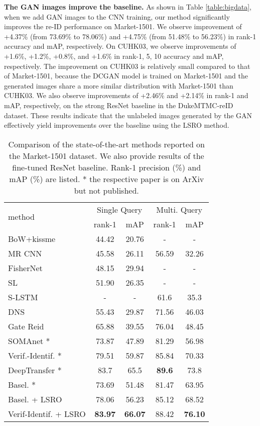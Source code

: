 \documentclass[10pt,twocolumn,letterpaper]{article}
\begin{document}
\textbf{The GAN images improve the baseline.}
As shown in Table \ref{table:bigdata}, when we add  GAN images to the CNN training, our method significantly improves the re-ID performance on Market-1501. We observe improvement of +4.37\% (from 73.69\% to 78.06\%) and +4.75\% (from 51.48\% to 56.23\%) in rank-1 accuracy and mAP, respectively. On CUHK03, we observe improvements of +1.6\%, +1.2\%, +0.8\%, and +1.6\% in rank-1, 5, 10 accuracy and mAP, respectively. The improvement on CUHK03 is relatively small compared to that of Market-1501, because the DCGAN model is trained on Market-1501 and the generated images share a more similar distribution with Market-1501 than CUHK03. We also observe improvements of +2.46\% and +2.14\% in rank-1 and mAP, respectively, on the strong ResNet baseline in the DukeMTMC-reID dataset. These results indicate that the unlabeled images generated by the GAN effectively yield improvements over the baseline using the LSRO method. 
\setlength{\tabcolsep}{5.7pt}
\begin{table}
\begin{center}
\begin{tabular}{l|cc|cc}
\hline
\multirow{2}{*}{method} & \multicolumn{2}{c|}{Single Query} & \multicolumn{2}{c}{Multi. Query}\\
& rank-1 & mAP & rank-1  & mAP \\
\hline
BoW+kissme \cite{zheng2015scalable} & 44.42 & 20.76  & - & -\\
MR CNN \cite{ustinova2015multiregion} & 45.58 & 26.11 & 56.59 & 32.26 \\
FisherNet \cite{wu2016deep} & 48.15 & 29.94 & - & -\\
SL \cite{chen2016similarity} & 51.90 & 26.35  & - & -\\
S-LSTM \cite{varior2016siamese} & - & - & 61.6 & 35.3 \\
DNS \cite{zhang2016learning} & 55.43 & 29.87 & 71.56 & 46.03 \\
Gate Reid \cite{varior2016gated}  & 65.88 & 39.55& 76.04 & 48.45 \\
SOMAnet \cite{barbosa2017looking}*& 73.87 & 47.89 & 81.29 & 56.98 \\ 
Verif.-Identif. \cite{zheng2016discriminatively}* & 79.51 & 59.87  & 85.84 & 70.33 \\
DeepTransfer \cite{geng2016deep}* & 83.7 & 65.5 & \textbf{89.6} & 73.8 \\ 
\hline
Basel. \cite{zheng2016survey,zheng2016discriminatively}* & 73.69 & 51.48 & 81.47 & 63.95 \\
Basel. + LSRO & 78.06 & 56.23  & 85.12 & 68.52 \\
Verif-Identif. + LSRO & \textbf{83.97} & \textbf{66.07} & 88.42 & \textbf{76.10}  \\
\hline
\end{tabular}
\end{center}
\caption{Comparison of the state-of-the-art methods reported on the Market-1501 dataset. We also provide results of the fine-tuned ResNet baseline. Rank-1 precision (\%) and mAP (\%) are listed. * the respective paper is on ArXiv but not published.}
\label{table:mr}
\end{table}
\end{document}
